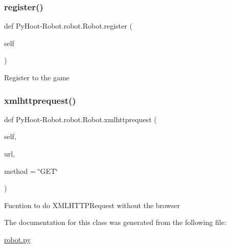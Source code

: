 \subsubsection{\texorpdfstring{register()}{register()}}
{\footnotesize\ttfamily def Py\+Hoot-\/Robot.\+robot.\+Robot.\+register (\begin{DoxyParamCaption}\item[{}]{self }\end{DoxyParamCaption})}

\begin{DoxyVerb}Register to the game\end{DoxyVerb}
 \mbox{\label{class_py_hoot-_robot_1_1robot_1_1_robot_a37850158bb7394027449bfc6f07d493f}} 
\subsubsection{\texorpdfstring{xmlhttprequest()}{xmlhttprequest()}}
{\footnotesize\ttfamily def Py\+Hoot-\/Robot.\+robot.\+Robot.\+xmlhttprequest (\begin{DoxyParamCaption}\item[{}]{self,  }\item[{}]{url,  }\item[{}]{method = {\ttfamily \char`\"{}GET\char`\"{}} }\end{DoxyParamCaption})}

\begin{DoxyVerb}Fucntion to do XMLHTTPRequest without the browser\end{DoxyVerb}
 

The documentation for this class was generated from the following file\+:\begin{DoxyCompactItemize}
\item 
\hyperlink{robot_8py}{robot.\+py}\end{DoxyCompactItemize}
